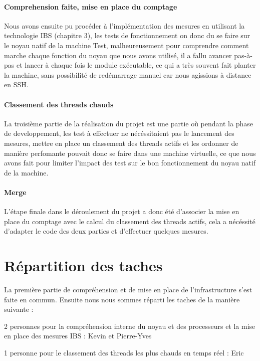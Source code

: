       \paragraph{Comprehension faite, mise en place du comptage}
        Nous avons ensuite pu procéder à l'implémentation des mesures en
        utilisant la technologie IBS (chapitre 3), les tests de fonctionnement
        on donc du se faire sur le noyau natif de la machine Test,
        malheureusement pour comprendre comment marche chaque fonction du noyau
        que nous avons utilisé, il a fallu avancer pas-à-pas et lancer à chaque
        fois le module exécutable, ce qui a très souvent fait planter la
        machine, sans possibilité de redémarrage manuel car nous agissions à
        distance en SSH.

      \paragraph{Classement des threads chauds}
        La troisième partie de la réalisation du projet est une partie où
        pendant la phase de developpement, les test à effectuer ne nécéssitaient
        pas le lancement des mesures, mettre en place un classement des threads
        actifs et les ordonner de manière perfomante pouvait donc se faire dans
        une machine virtuelle, ce que nous avons fait pour limiter l'impact des
        test sur le bon fonctionnement du noyau natif de la machine.

      \paragraph{Merge}
        L'étape finale dans le déroulement du projet a donc été d'associer la
        mise en place du comptage avec le calcul du classement des threads
        actifs, cela a nécéssité d'adapter le code des deux parties et
        d'effectuer quelques mesures.


  \section{Répartition des taches}
    La première partie de compréhension et de mise en place de l'infrastructure
    s'est faite en commun. Ensuite nous nous sommes réparti les taches de la
    manière suivante :

    \bitem
      \item{2 personnes pour la compréhension interne du noyau et des
        processeurs et la mise en place des mesures IBS : Kevin et Pierre-Yves}
      \item{1 personne pour le classement des threads les plus chauds en temps
        réel : Eric}
    \eitem
	
